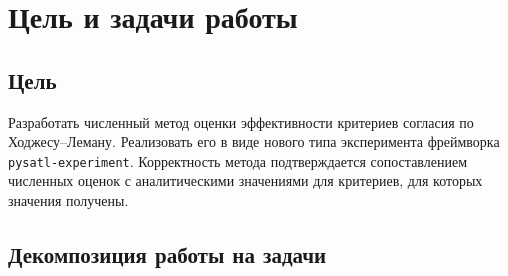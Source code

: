 \section{Цель и задачи работы}

\subsection{Цель}
Разработать численный метод оценки эффективности критериев согласия по Ходжесу--Леману.
Реализовать его в виде нового типа эксперимента фреймворка
\texttt{pysatl-\allowbreak{}experiment}. Корректность метода
подтверждается сопоставлением численных оценок с аналитическими значениями для критериев,
для которых значения получены.

\subsection{Декомпозиция работы на задачи}

